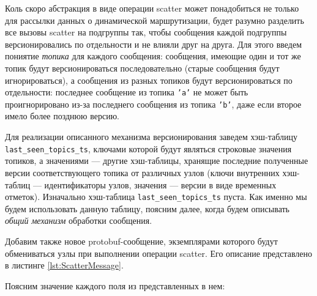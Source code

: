 \documentclass{article}
\theoremstyle{plain}
\theoremstyle{plain}
\theoremstyle{plain}
\theoremstyle{plain}
\theoremstyle{definition}
\theoremstyle{remark}
\theoremstyle{plain}
\begin{document}
Коль скоро абстракция в виде операции scatter может понадобиться не только для рассылки данных о динамической маршрутизации, будет разумно разделить все вызовы scatter на подгруппы так, чтобы сообщения каждой подгруппы версионировались по отдельности и не влияли друг на друга. Для этого введем пониятие \textit{топика} для каждого сообщения: сообщения, имеющие один и тот же топик будут версионироваться последовательно (старые сообщения будут игнорироваться), а сообщения из разных топиков будут версионироваться по отдельности: последнее сообщение из топика \texttt{'a'} не может быть проигнорировано из-за последнего сообщения из топика \texttt{'b'}, даже если второе имело более позднюю версию.

Для реализации описанного механизма версионирования заведем хэш-таблицу \\
\texttt{last\_seen\_topics\_ts}, ключами которой будут являться строковые значения топиков, а значениями --- другие хэш-таблицы, хранящие последние полученные версии соответствующего топика от различных узлов (ключи внутренних хэш-таблиц --- идентификаторы узлов, значения --- версии в виде временных отметок). Изначально хэш-таблица \texttt{last\_seen\_topics\_ts} пуста. Как именно мы будем использовать данную таблицу, поясним далее, когда будем описывать \textit{общий механизм} обработки сообщения.

Добавим также новое protobuf-сообщение, экземплярами которого будут обмениваться узлы при выполнении операции scatter. Его описание представлено в листинге \ref{lst:ScatterMessage}.



Поясним значение каждого поля из представленных в нем:
\end{document}
